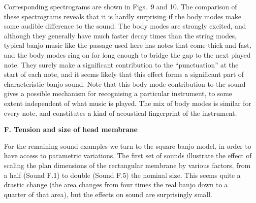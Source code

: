 

  Corresponding spectrograms are shown in Figs.\ 9 and 10. The comparison of 
  these spectrograms reveals that it is hardly surprising if the body modes 
  make some audible difference to the sound. The body modes are strongly 
  excited, and although they generally have much faster decay times than the 
  string modes, typical banjo music like the passage used here has notes that 
  come thick and fast, and the body modes ring on for long enough to bridge the 
  gap to the next played note. They surely make a significant contribution to 
  the ``punctuation'' at the start of each note, and it seems likely that this 
  effect forms a significant part of characteristic banjo sound. Note that this 
  body mode contribution to the sound gives a possible mechanism for 
  recognising a particular instrument, to some extent independent of what music 
  is played. The mix of body modes is similar for every note, and constitutes a 
  kind of acoustical fingerprint of the instrument. 



  \textbf{F. Tension and size of head membrane} 

  For the remaining sound examples we turn to the square banjo model, in order 
  to have access to parametric variations. The first set of sounds illustrate 
  the effect of scaling the plan dimensions of the rectangular membrane by 
  various factors, from a half (Sound F.1) to double (Sound F.5) the nominal 
  size. This seems quite a drastic change (the area changes from four times the 
  real banjo down to a quarter of that area), but the effects on sound are 
  surprisingly small. 


